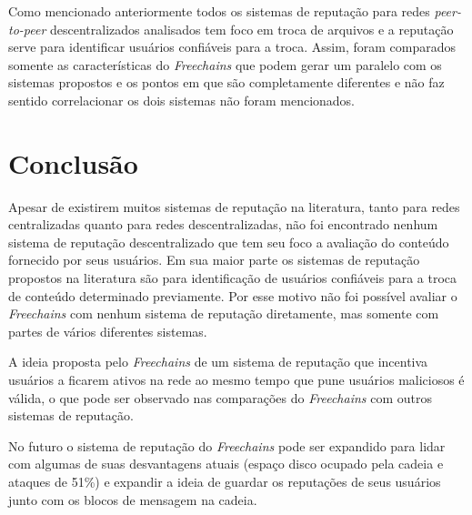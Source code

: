 \documentclass[12pt]{article}
\newcommand{\FC} {\emph{Freechains}\xspace}
\newcommand{\PtoP} {\emph{peer-to-peer}\xspace}
\begin{document}
Como mencionado anteriormente todos os sistemas de reputação para redes \PtoP descentralizados analisados tem foco em troca de arquivos e a reputação serve para identificar usuários confiáveis para a troca. Assim, foram comparados somente as características do \FC que podem gerar um paralelo com os sistemas propostos e os pontos em que são completamente diferentes e não faz sentido correlacionar os dois sistemas não foram mencionados.  

\section{Conclusão}\label{sec:conclusao}

Apesar de existirem muitos sistemas de reputação na literatura, tanto para redes centralizadas quanto para redes descentralizadas, não foi encontrado nenhum sistema de reputação descentralizado que tem seu foco a avaliação do conteúdo fornecido por seus usuários. Em sua maior parte os sistemas de reputação propostos na literatura são para identificação de usuários confiáveis para a troca de conteúdo determinado previamente. Por esse motivo não foi possível avaliar o \FC com nenhum sistema de reputação diretamente, mas somente com partes de vários diferentes sistemas.

A ideia proposta pelo \FC de um sistema de reputação que incentiva usuários a ficarem ativos na rede ao mesmo tempo que pune usuários maliciosos é válida, o que pode ser observado nas comparações do \FC com outros sistemas de reputação. 

No futuro o sistema de reputação do \FC pode ser expandido para lidar com algumas de suas desvantagens atuais (espaço disco ocupado pela cadeia e ataques de 51\%) e expandir a ideia de guardar os reputações de seus usuários junto com os blocos de mensagem na cadeia.



\end{document}
